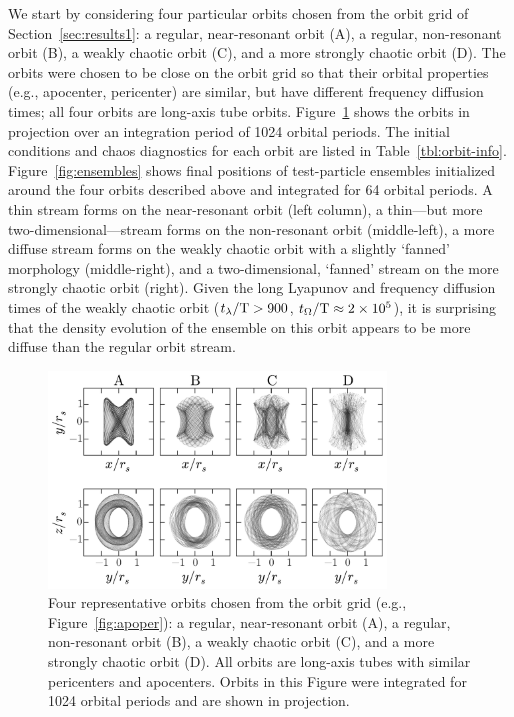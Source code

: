 \documentclass[letterpaper,12pt,preprint]{aastex}
\newcommand{\periods}{\ensuremath{{\rm T}}}
\begin{document}
We start by considering four particular orbits chosen from the orbit grid of Section~\ref{sec:results1}: a regular, near-resonant orbit (A), a regular, non-resonant orbit (B), a weakly chaotic orbit (C), and a more strongly chaotic orbit (D). The orbits were chosen to be close on the orbit grid so that their orbital properties (e.g., apocenter, pericenter) are similar, but have different frequency diffusion times; all four orbits are long-axis tube orbits. Figure~\ref{fig:orbits} shows the orbits in projection over an integration period of 1024 orbital periods. The initial conditions and chaos diagnostics for each orbit are listed in Table~\ref{tbl:orbit-info}. Figure~\ref{fig:ensembles} shows final positions of test-particle ensembles initialized around the four orbits described above and integrated for 64 orbital periods. A thin stream forms on the near-resonant orbit (left column), a thin---but more two-dimensional---stream forms on the non-resonant orbit (middle-left), a more diffuse stream forms on the weakly chaotic orbit with a slightly `fanned' morphology (middle-right), and a two-dimensional, `fanned' stream on the more strongly chaotic orbit (right). Given the long Lyapunov and frequency diffusion times of the weakly chaotic orbit ($t_\lambda/\periods > 900$, $t_\Omega/\periods \approx 2\times10^5$), it is surprising that the density evolution of the ensemble on this orbit appears to be more diffuse than the regular orbit stream.

\begin{figure}[h]%
\begin{center}
\includegraphics[width=0.8\textwidth]{figures/four-orbits.pdf}
\caption{Four representative orbits chosen from the orbit grid (e.g., Figure~\ref{fig:apoper}): a regular, near-resonant orbit (A), a regular, non-resonant orbit (B), a weakly chaotic orbit (C), and a more strongly chaotic orbit (D). All orbits are long-axis tubes with similar pericenters and apocenters. Orbits in this Figure were integrated for 1024 orbital periods and are shown in projection.}
\label{fig:orbits}
\end{center}
\end{figure}
\end{document}
